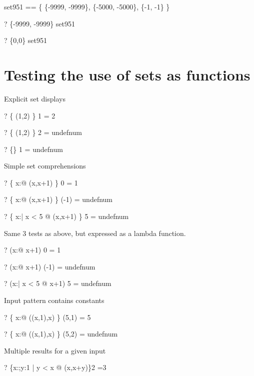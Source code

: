 \documentclass{article}
\newcommand{\negate}{-}
\begin{document}
\begin{zed}
  set951 == \{ \{\negate 9999, \negate 9999\},
               \{\negate 5000, \negate 5000\}, 
               \{\negate 1, \negate 1\} \}
\end{zed}

\begin{zed} \vdash?  \{\negate9999, \negate9999\} \in set951 \end{zed}
\begin{zed} \vdash?  \{0,0\} \notin set951 \end{zed}


\section{Testing the use of sets as functions}
Explicit set displays
\begin{zed} \vdash?   \{ (1,2) \} 1 = 2 \end{zed}
\begin{zed} \vdash?  \{ (1,2) \} 2 = undefnum \end{zed}
\begin{zed} \vdash?  \{\} 1 = undefnum \end{zed}
Simple set comprehensions
\begin{zed} \vdash?   \{ x:\nat @ (x,x+1) \} 0 = 1 \end{zed}
\begin{zed} \vdash?  \{ x:\nat @ (x,x+1) \} (\negate 1) = undefnum \end{zed}
\begin{zed} \vdash?  \{ x:\nat | x < 5 @ (x,x+1) \} 5 = undefnum \end{zed}
Same 3 tests as above, but expressed as a lambda function.
\begin{zed} \vdash?   (\lambda x:\nat @ x+1) 0 = 1 \end{zed}
\begin{zed} \vdash?  (\lambda x:\nat @ x+1) (\negate 1) = undefnum \end{zed}
\begin{zed} \vdash?  (\lambda x:\nat | x < 5 @ x+1) 5 = undefnum \end{zed}
Input pattern contains constants
\begin{zed} \vdash?   \{ x:\nat @ ((x,1),x) \} (5,1) = 5 \end{zed}
\begin{zed} \vdash?  \{ x:\nat @ ((x,1),x) \} (5,2) = undefnum \end{zed}
Multiple results for a given input
\begin{zed}\vdash? \{x:\nat;y:1  | y < x @ (x,x+y)\}2 =3\end{zed}
\end{document}
